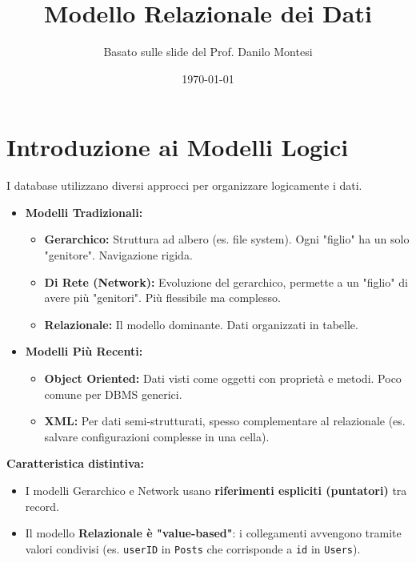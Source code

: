 

\usepackage{hyperref}

\title{Modello Relazionale dei Dati}
\author{Basato sulle slide del Prof. Danilo Montesi}
\date{\today}


	
	\maketitle
	\tableofcontents
	\newpage
	
	\section{Introduzione ai Modelli Logici}
	I database utilizzano diversi approcci per organizzare logicamente i dati.
	\begin{itemize}
		\item \textbf{Modelli Tradizionali:}
		\begin{itemize}
			\item \textbf{Gerarchico:} Struttura ad albero (es. file system). Ogni "figlio" ha un solo "genitore". Navigazione rigida.
			\item \textbf{Di Rete (Network):} Evoluzione del gerarchico, permette a un "figlio" di avere più "genitori". Più flessibile ma complesso.
			\item \textbf{Relazionale:} Il modello dominante. Dati organizzati in tabelle.
		\end{itemize}
		\item \textbf{Modelli Più Recenti:}
		\begin{itemize}
			\item \textbf{Object Oriented:} Dati visti come oggetti con proprietà e metodi. Poco comune per DBMS generici.
			\item \textbf{XML:} Per dati semi-strutturati, spesso complementare al relazionale (es. salvare configurazioni complesse in una cella).
		\end{itemize}
	\end{itemize}
	
	\textbf{Caratteristica distintiva:}
	\begin{itemize}
		\item I modelli Gerarchico e Network usano \textbf{riferimenti espliciti (puntatori)} tra record.
		\item Il modello \textbf{Relazionale è "value-based"}: i collegamenti avvengono tramite valori condivisi (es. \texttt{userID} in \texttt{Posts} che corrisponde a \texttt{id} in \texttt{Users}).
	\end{itemize}
	
